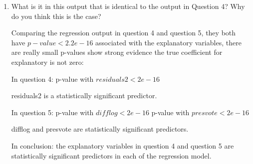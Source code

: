 \documentclass[12pt,letterpaper]{article}
\begin{document}
\begin{enumerate}
		\item What is it in this output that is identical to the output in Question 4? Why do you think this is the case?

  Comparing the regression output in question 4 and question 5, they both have $p-value < 2.2e-16$ associated with the explanatory variables,  there are really small p-values show strong evidence the true coefficient for explanatory  is not  zero:
  
 In question 4: p-value with $residuals2 < 2e-16$

 residuals2 is a statistically significant predictor.
 
   In question  5:  p-value with $difflog < 2e-16$  p-value with  $presvote <2e-16$

difflog and presvote are statistically significant predictors.

   In conclusion: the explanatory variables in question 4 and question 5 are statistically significant predictors in  each of the regression model.
 
	\end{enumerate}
\end{document}

